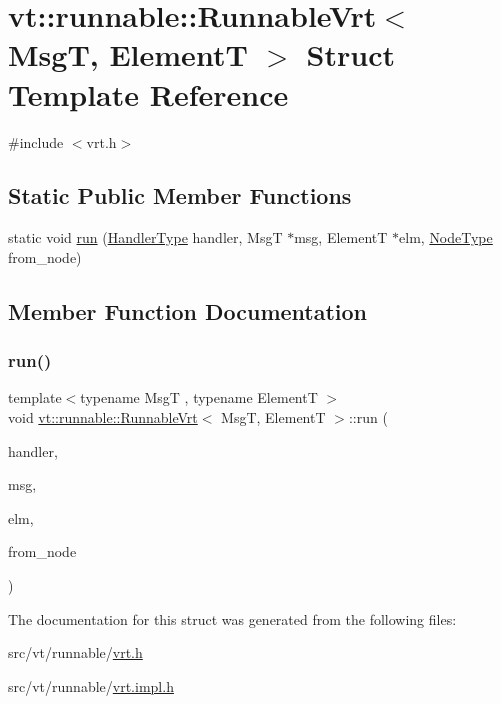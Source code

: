 \hypertarget{structvt_1_1runnable_1_1_runnable_vrt}{}\section{vt\+:\+:runnable\+:\+:Runnable\+Vrt$<$ MsgT, ElementT $>$ Struct Template Reference}
\label{structvt_1_1runnable_1_1_runnable_vrt}


{\ttfamily \#include $<$vrt.\+h$>$}

\subsection*{Static Public Member Functions}
\begin{DoxyCompactItemize}
\item 
static void \hyperlink{structvt_1_1runnable_1_1_runnable_vrt_a16771ba4660cda2430747fcd1ef8a467}{run} (\hyperlink{namespacevt_af64846b57dfcaf104da3ef6967917573}{Handler\+Type} handler, MsgT $\ast$msg, ElementT $\ast$elm, \hyperlink{namespacevt_a866da9d0efc19c0a1ce79e9e492f47e2}{Node\+Type} from\+\_\+node)
\end{DoxyCompactItemize}


\subsection{Member Function Documentation}
\mbox{\label{structvt_1_1runnable_1_1_runnable_vrt_a16771ba4660cda2430747fcd1ef8a467}} 
\subsubsection{\texorpdfstring{run()}{run()}}
{\footnotesize\ttfamily template$<$typename MsgT , typename ElementT $>$ \\
void \hyperlink{structvt_1_1runnable_1_1_runnable_vrt}{vt\+::runnable\+::\+Runnable\+Vrt}$<$ MsgT, ElementT $>$\+::run (\begin{DoxyParamCaption}\item[{\hyperlink{namespacevt_af64846b57dfcaf104da3ef6967917573}{Handler\+Type}}]{handler,  }\item[{MsgT $\ast$}]{msg,  }\item[{ElementT $\ast$}]{elm,  }\item[{\hyperlink{namespacevt_a866da9d0efc19c0a1ce79e9e492f47e2}{Node\+Type}}]{from\+\_\+node }\end{DoxyParamCaption})\hspace{0.3cm}{\ttfamily [static]}}



The documentation for this struct was generated from the following files\+:\begin{DoxyCompactItemize}
\item 
src/vt/runnable/\hyperlink{vrt_8h}{vrt.\+h}\item 
src/vt/runnable/\hyperlink{vrt_8impl_8h}{vrt.\+impl.\+h}\end{DoxyCompactItemize}
